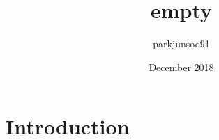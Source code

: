 \documentclass{article}
\title{empty}
\author{parkjunsoo91 }
\date{December 2018}
\begin{document}
\maketitle

\section{Introduction}
\end{document}
